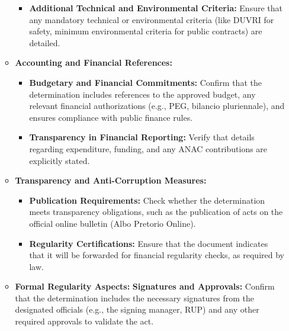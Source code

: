 \documentclass[../main.tex]{subfiles}
\begin{document}
\begin{enumerate}
\begin{itemize}
\begin{itemize}
            \item \textbf{Additional Technical and Environmental Criteria:} Ensure that any mandatory technical or environmental criteria (like DUVRI for safety, minimum environmental criteria for public contracts) are detailed.
        \end{itemize}
        \item \textbf{Accounting and Financial References:}
        \begin{itemize}
            \item \textbf{Budgetary and Financial Commitments:} Confirm that the determination includes references to the approved budget, any relevant financial authorizations (e.g., PEG, bilancio pluriennale), and ensures compliance with public finance rules.
            \item \textbf{Transparency in Financial Reporting:} Verify that details regarding expenditure, funding, and any ANAC contributions are explicitly stated.
        \end{itemize}
        \item \textbf{Transparency and Anti-Corruption Measures:}
        \begin{itemize}
            \item \textbf{Publication Requirements:} Check whether the determination meets transparency obligations, such as the publication of acts on the official online bulletin (Albo Pretorio Online).
            \item \textbf{Regularity Certifications:} Ensure that the document indicates that it will be forwarded for financial regularity checks, as required by law.
        \end{itemize}
        \item \textbf{Formal Regularity Aspects:}
\textbf{Signatures and Approvals:} Confirm that the determination includes the necessary signatures from the designated officials (e.g., the signing manager, RUP) and any other required approvals to validate the act.

    \end{itemize}
\end{enumerate}


\end{document}
